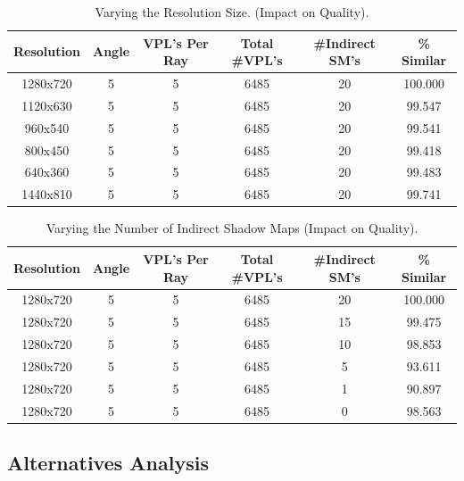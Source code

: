 \begin{table}[h!]\centering
	\caption{Varying the Resolution Size. (Impact on Quality).}
	\begin{center}
	    \begin{tabular}{ | c | c | c | c | c | c |}
	    \hline
	    Resolution & Angle & VPL's Per Ray & Total \#VPL's & \#Indirect SM's & \% Similar\\ \hline
	    1280x720 & 5 & 5 & 6485 & 20 & 100.000\\ \hline
	    1120x630 & 5 & 5 & 6485 & 20 & 99.547\\ \hline
	    960x540 & 5 & 5 & 6485 & 20 & 99.541\\ \hline
	    800x450 & 5 & 5 & 6485 & 20 & 99.418\\ \hline
	    640x360 & 5 & 5 & 6485 & 20 & 99.483\\ \hline
	    1440x810 & 5 & 5 & 6485 & 20 & 99.741\\ \hline
	    \end{tabular}
	\end{center}
	\label{table:5.7}
\end{table}
\begin{table}[h!]\centering
	\caption{Varying the Number of Indirect Shadow Maps (Impact on Quality).}
	\begin{center}
	    \begin{tabular}{ | c | c | c | c | c | c |}
	    \hline
	    Resolution & Angle & VPL's Per Ray & Total \#VPL's & \#Indirect SM's & \% Similar\\ \hline
	    1280x720 & 5 & 5 & 6485 & 20 & 100.000\\ \hline
	    1280x720 & 5 & 5 & 6485 & 15 & 99.475\\ \hline
	    1280x720 & 5 & 5 & 6485 & 10 & 98.853\\ \hline
	    1280x720 & 5 & 5 & 6485 & 5 & 93.611\\ \hline
	    1280x720 & 5 & 5 & 6485 & 1 & 90.897\\ \hline
	    1280x720 & 5 & 5 & 6485 & 0 & 98.563\\ \hline
	    \end{tabular}
	\end{center}
	\label{table:5.8}
\end{table}
\subsection{Alternatives Analysis} \label{sec:alternatives}
